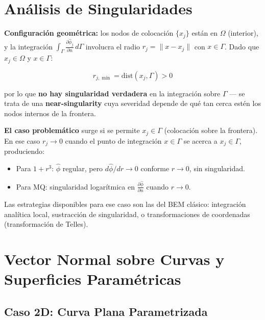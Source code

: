 \documentclass[12pt,a4paper]{article}
\begin{document}
\section{Análisis de Singularidades}

\textbf{Configuración geométrica:} los nodos de colocación $\{x_j\}$ están en
$\Omega$ (interior), y la integración $\int_\Gamma \frac{\partial\hat{\phi}_j}
{\partial n}\,d\Gamma$ involucra el radio $r_j = \|x - x_j\|$ con $x\in\Gamma$.
Dado que $x_j\in\Omega$ y $x\in\Gamma$:

\begin{equation}
    r_{j,\min} = \mathrm{dist}(x_j, \Gamma) > 0
\end{equation}

por lo que \textbf{no hay singularidad verdadera} en la integración sobre
$\Gamma$ — se trata de una \textbf{near-singularity} cuya severidad depende de
qué tan cerca estén los nodos internos de la frontera.

\textbf{El caso problemático} surge si se permite $x_j\in\Gamma$ (colocación
sobre la frontera). En ese caso $r_j\to 0$ cuando el punto de integración
$x\in\Gamma$ se acerca a $x_j\in\Gamma$, produciendo:

\begin{itemize}
    \item Para $1+r^3$: $\hat{\phi}$ regular, pero $d\hat{\phi}/dr\to 0$
    conforme $r\to 0$, sin singularidad.
    \item Para MQ: singularidad logarítmica en $\frac{\partial\hat{\phi}}
    {\partial n}$ cuando $r\to 0$.
\end{itemize}

Las estrategias disponibles para ese caso son las del BEM clásico:
integración analítica local, sustracción de singularidad, o transformaciones
de coordenadas (transformación de Telles).

\section{Vector Normal sobre Curvas y Superficies Paramétricas}

\subsection{Caso 2D: Curva Plana Parametrizada}
\end{document}
